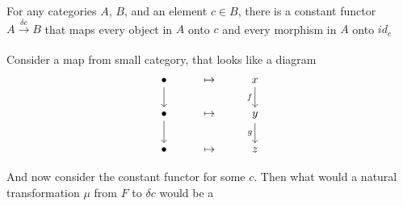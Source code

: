 \begin{definition}
    For any categories $A$, $B$, and an element $c \in B$, there is a constant functor $A \xrightarrow[]{\delta c} B$ that maps every object in $A$ onto $c$ and every morphism in $A$ onto $id_c$
\end{definition}

Consider a map from small category, that looks like a diagram
\[\begin{tikzcd}
	\bullet & \mapsto & x \\
	\bullet & \mapsto & y \\
	\bullet & \mapsto & z
	\arrow[from=1-1, to=2-1]
	\arrow[from=2-1, to=3-1]
	\arrow["f"', from=1-3, to=2-3]
	\arrow["g"', from=2-3, to=3-3]
\end{tikzcd}\]

And now consider the constant functor for some $c$. Then what would a natural transformation $\mu$ from $F$ to $\delta c$ would be a 



